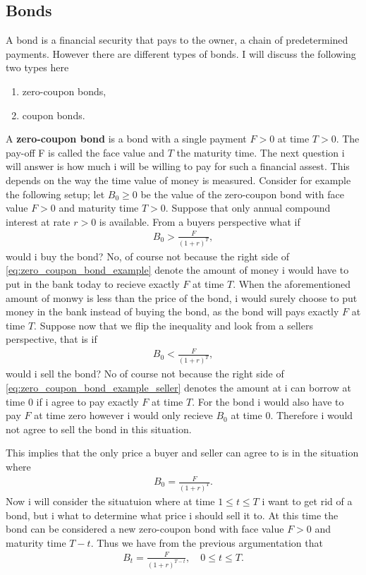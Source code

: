 \documentclass{article}
\theoremstyle{definition}
\numberwithin{equation}{section}
\begin{document}
\subsection{Bonds}
A bond is a financial security that pays to the owner, a chain of predetermined payments.
However there are different types of bonds.
I will discuss the following two types here
\begin{enumerate}
    \item zero-coupon bonds,
    \item coupon bonds.
\end{enumerate}
A \textbf{zero-coupon bond} is a bond with a single payment $F > 0$ at time $T > 0$.
The pay-off F is called the face value and $T$ the maturity time.
The next question i will answer is how much i will be willing to pay for such a financial assest.
This depends on the way the time value of money is measured.
Consider for example the following setup; let $B_0 \geq 0$ be the value of the zero-coupon bond with face value $F>0$ and maturity time $T>0$.
Suppose that only annual compound interest at rate $r>0$ is available.
From a buyers perspective what if
\begin{align}\label{eq:zero_coupon_bond_example}
    B_0 > \frac{F}{(1 + r)^T},
\end{align}
would i buy the bond? 
No, of course not because the right side of \eqref{eq:zero_coupon_bond_example} denote the amount of money i would have to put in the bank today to recieve exactly $F$ at time $T$.
When the aforementioned amount of monwy is less than the price of the bond, i would surely choose to put money in the bank instead of buying the bond, as the bond will pays exactly $F$ at time $T$.
Suppose now that we flip the inequality and look from a sellers perspective, that is if
\begin{align}\label{eq:zero_coupon_bond_example_seller}
    B_0 < \frac{F}{(1 + r)^T},
\end{align}
would i sell the bond? 
No of course not because the right side of \eqref{eq:zero_coupon_bond_example_seller} denotes the amount at i can borrow at time 0 if i agree to pay exactly $F$ at time $T$.
For the bond i would also have to pay $F$ at time zero however i would only recieve $B_0$ at time 0.
Therefore i would not agree to sell the bond in this situation.

This implies that the only price a buyer and seller can agree to is in the situation where
\begin{align}
    B_0 = \frac{F}{(1 + r)^T}.
\end{align}
Now i will consider the situatuion where at time $1 \leq t \leq T$ i want to get rid of a bond, but i what to determine what price i should sell it to.
At this time the bond can be considered a new zero-coupon bond with face value $F > 0$ and maturity time $T - t$.
Thus we have from the previous argumentation that
\begin{align}
    B_t = \frac{F}{(1 + r)^{T - t}}, \quad 0 \leq t \leq T.
\end{align} 
\end{document}
